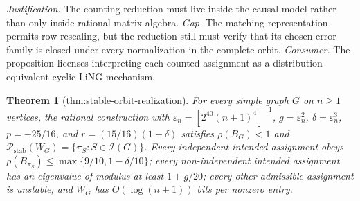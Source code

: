 \documentclass{article}
\newtheorem{theorem}{Theorem}
\begin{document}
\par\smallskip\noindent \textit{Justification.} The counting reduction must live inside the causal model rather than only inside rational matrix algebra. \textit{Gap.} The matching representation permits row rescaling, but the reduction still must verify that its chosen error family is closed under every normalization in the complete orbit. \textit{Consumer.} The proposition licenses interpreting each counted assignment as a distribution-equivalent cyclic LiNG mechanism.

\begin{theorem}[thm:stable-orbit-realization]\label{thm:stable-orbit-realization}
For every simple graph \(G\) on \(n\geq1\) vertices, the rational construction with \(\varepsilon_n=[2^{40}(n+1)^4]^{-1}\), \(g=\varepsilon_n^2\), \(\delta=\varepsilon_n^3\), \(p=-25/16\), and \(r=(15/16)(1-\delta)\) satisfies \(\rho(B_G)<1\) and \(\mathcal P_{\mathrm{stab}}(W_G)=\{\pi_S:S\in\mathcal I(G)\}\). Every independent intended assignment obeys \(\rho(B_{\pi_S})\leq\max\{9/10,1-\delta/10\}\); every non-independent intended assignment has an eigenvalue of modulus at least \(1+g/20\); every other admissible assignment is unstable; and \(W_G\) has \(O(\log(n+1))\) bits per nonzero entry.
\end{theorem}
\end{document}
